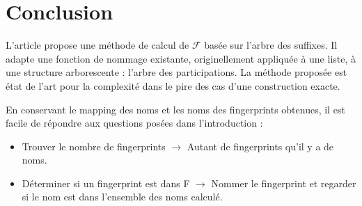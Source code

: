 \documentclass[a4paper]{article}
\begin{document}
\section{Conclusion}

L'article propose une méthode de calcul de $\mathcal{F}$ basée sur l'arbre des suffixes. Il adapte une fonction de nommage existante, originellement appliquée à une liste, à une structure arborescente : l'arbre des participations. La méthode proposée est état de l'art pour la complexité dans le pire des cas d'une construction exacte. \newline

En conservant le mapping des noms et les noms des fingerprints obtenues, il est facile de répondre aux questions posées dans l'introduction :\newline

\begin{itemize}
	\item Trouver le nombre de fingerprints \newline $\rightarrow$ Autant de fingerprints qu'il y a de noms.
	\item Déterminer si un fingerprint est dans F \newline $\rightarrow$ Nommer le fingerprint et regarder si le nom est dans l'ensemble des noms calculé. \newline
\end{itemize} 



\end{document}
